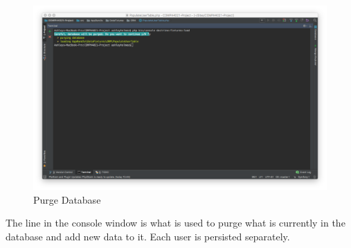 \begin{figure}[htbp]
   \centering
   \includegraphics[width=400pt]{figures/fixtures_load_purge.png} %
   \caption{Purge Database}
   \label{fig:Purge Database}
\end{figure}

The line in the console window is what is used to purge what is currently in the database and add new data to it. Each user is persisted separately. 